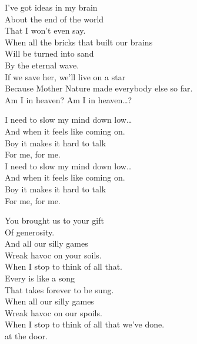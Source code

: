 I've got ideas in my brain \\
About the end of the world \\
That I won't even say. \\
When all the bricks that built our brains \\
Will be turned into sand \\
By the eternal wave. \\

If we save her, we'll live on a star \\
Because Mother Nature made everybody else so far. \\

Am I in heaven? Am I in heaven…?





I need to slow my mind down low… \\

And when it feels like coming on. \\
Boy it makes it hard to talk \\
For me, for me. \\

I need to slow my mind down low… \\

And when it feels like coming on. \\
Boy it makes it hard to talk \\
For me, for me. \\





You brought us to your gift \\
Of generosity. \\
And all our silly games \\
Wreak havoc on your soils. \\
When I stop to think of all that. \\

Every  is like a song \\
That takes forever to be sung. \\
When all our silly games \\
Wreak havoc on our spoils. \\
When I stop to think of all that we've done. \\
 at the door. \\

